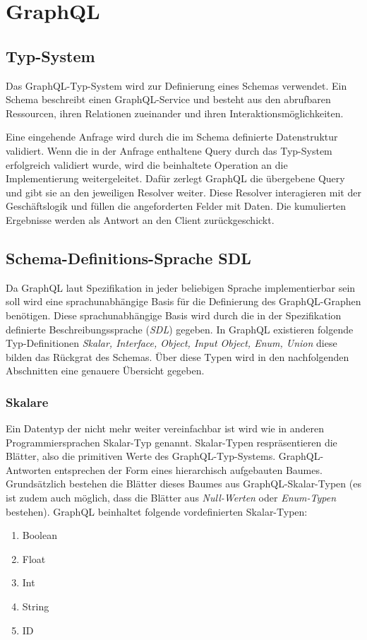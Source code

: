 \chapter{GraphQL}
\section{Typ-System}

Das GraphQL-Typ-System wird zur Definierung eines Schemas verwendet.
Ein Schema beschreibt einen GraphQL-Service und besteht aus den abrufbaren Ressourcen, ihren Relationen zueinander und ihren Interaktionsmöglichkeiten.


Eine eingehende Anfrage wird durch die im Schema definierte Datenstruktur validiert.
Wenn die in der Anfrage enthaltene Query durch das Typ-System erfolgreich validiert wurde, wird die beinhaltete Operation an die Implementierung weitergeleitet.
Dafür zerlegt GraphQL die übergebene Query und gibt sie an den jeweiligen Resolver weiter. Diese Resolver interagieren mit der Geschäftslogik und füllen die angeforderten Felder mit Daten.
Die kumulierten Ergebnisse werden als Antwort an den Client zurückgeschickt. 


\section{Schema-Definitions-Sprache SDL}
Da GraphQL laut Spezifikation in jeder beliebigen Sprache implementierbar sein soll wird eine sprachunabhängige Basis für die Definierung des GraphQL-Graphen benötigen.
Diese sprachunabhängige Basis wird durch die in der Spezifikation definierte Beschreibungssprache (\textit{SDL}) gegeben. 
In GraphQL existieren folgende Typ-Definitionen \textit{Skalar, Interface, Object, Input Object, Enum, Union} diese bilden das Rückgrat des Schemas.
Über diese Typen wird in den nachfolgenden Abschnitten eine genauere Übersicht gegeben.

\subsection{Skalare}

Ein Datentyp der nicht mehr weiter vereinfachbar ist wird wie in anderen Programmiersprachen Skalar-Typ genannt.
Skalar-Typen respräsentieren die Blätter, also die primitiven Werte des GraphQL-Typ-Systems. %
GraphQL-Antworten entsprechen der Form eines hierarchisch aufgebauten Baumes.
\newline
Grundsätzlich bestehen die Blätter dieses Baumes aus GraphQL-Skalar-Typen (es ist zudem auch möglich, dass die Blätter aus \textit{Null-Werten} oder \textit{Enum-Typen} bestehen).
GraphQL beinhaltet folgende vordefinierten Skalar-Typen:
\begin{enumerate}
    \item Boolean
    \item Float
    \item Int
    \item String
    \item ID
\end{enumerate}


